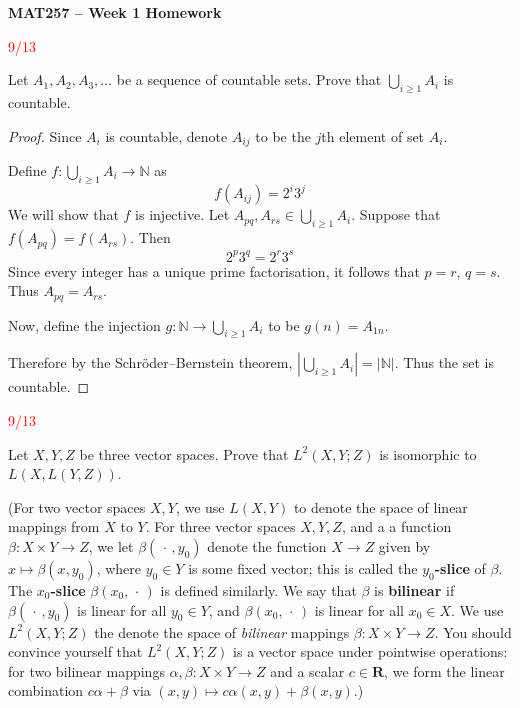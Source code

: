 \documentclass{article}
\newcommand{\R}{\mathbf{R}}
\newcommand{\due}[1]{\reversemarginpar\marginnote
    {\textcolor{red}{#1}}
    }
\theoremstyle{definition}
\begin{document}
\noindent
    {\large \textbf{MAT257 -- Week 1 Homework}}

\exercise \due{9/13}
    Let $A_1,A_2,A_3,\ldots$ be a sequence of countable sets. Prove that $\bigcup_{i\geq 1} A_i$ is countable.

\begin{proof}
    Since \(A_i\) is countable, denote \(A_{ij}\) to be the \(j\)th element of set \(A_i\).

    Define \(f: \bigcup_{i \ge 1} A_i \to \mathbb{N}\) as 
    \[
        f(A_{ij})=2^{i}3^{j}
    \]
    We will show that \(f\) is injective. Let \(A_{pq}, A_{rs} \in  \bigcup_{i \geq 1} A_i\). Suppose that \(f(A_{pq} ) = f(A_{rs} )\). Then
    \[
        2^p 3^q = 2^r 3^s
    \]
    Since every integer has a unique prime factorisation, it follows that \(p = r\), \(q = s\). Thus \(A_{pq} = A_{rs} \).

    \noindent Now, define the injection \(g: \mathbb{N} \to \bigcup_{i\geq 1} A_i\) to be \(g(n) = A_{1n} \). 
    
    \noindent Therefore by the Schröder–Bernstein theorem, \(|\bigcup_{i\geq 1} A_i | = |\mathbb{N} |\). Thus the set is countable.

\end{proof}
    
\exercise \due{9/13}
    Let $X,Y,Z$ be three vector spaces. Prove that $L^2(X,Y;Z)$ is isomorphic to $L(X,L(Y,Z))$.

   (For two vector spaces $X,Y$, we use $L(X,Y)$ to denote the space of linear mappings from $X$ to $Y$. For three vector spaces $X,Y,Z$, and a a function $\beta:X\times Y\rightarrow Z$, we let $\beta(\,\cdot\,,y_0)$ denote the function $X\rightarrow Z$ given by $x\mapsto \beta(x,y_0)$, where $y_0\in Y$ is some fixed vector; this is called the \textbf{$y_0$-slice} of $\beta$. The \textbf{$x_0$-slice} $\beta(x_0, \,\cdot\,)$ is defined similarly. We say that $\beta$ is \textbf{bilinear} if $\beta(\,\cdot\,,y_0)$ is linear for all $y_0\in Y$, and $\beta(x_0, \,\cdot\,)$ is linear for all $x_0\in X$. We use $L^2(X,Y;Z)$ the denote the space of \textit{bilinear} mappings $\beta:X\times Y\rightarrow Z$. You should convince yourself that $L^2(X,Y;Z)$ is a vector space under pointwise operations: for two bilinear mappings $\alpha,\beta:X\times Y\rightarrow Z$ and a scalar $c\in \R$, we form the linear combination $c\alpha+\beta$ via $(x,y)\mapsto c\alpha(x,y) + \beta(x,y)$.)
\end{document}
